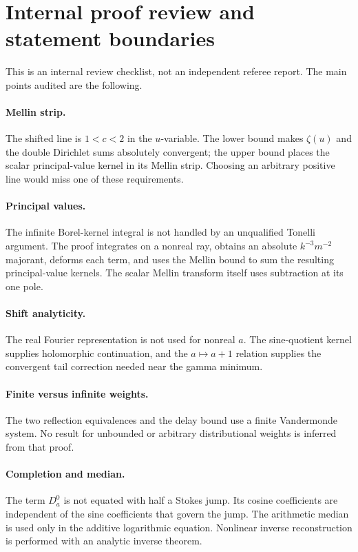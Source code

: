 \documentclass[11pt,a4paper]{article}
\numberwithin{equation}{section}
\theoremstyle{definition}
\theoremstyle{remark}
\begin{document}
\section{Internal proof review and statement boundaries}
\label{app:audit}
This is an internal review checklist, not an independent referee
report. The main points audited are the following.

\paragraph{Mellin strip.}
The shifted line is $1<c<2$ in the $u$-variable. The lower bound makes
$\zeta(u)$ and the double Dirichlet sums absolutely convergent; the
upper bound places the scalar principal-value kernel in its Mellin
strip. Choosing an arbitrary positive line would miss one of these
requirements.

\paragraph{Principal values.}
The infinite Borel-kernel integral is not handled by an unqualified
Tonelli argument. The proof integrates on a nonreal ray, obtains an
absolute $k^{-3}m^{-2}$ majorant, deforms each term, and uses the
Mellin bound to sum the resulting principal-value kernels. The scalar
Mellin transform itself uses subtraction at its one pole.

\paragraph{Shift analyticity.}
The real Fourier representation is not used for nonreal $a$. The
sine-quotient kernel supplies holomorphic continuation, and the
$a\mapsto a+1$ relation supplies the convergent tail correction needed
near the gamma minimum.

\paragraph{Finite versus infinite weights.}
The two reflection equivalences and the delay bound use a finite
Vandermonde system. No result for unbounded or arbitrary distributional
weights is inferred from that proof.

\paragraph{Completion and median.}
The term $D_a^0$ is not equated with half a Stokes jump. Its cosine
coefficients are independent of the sine coefficients that govern
the jump. The arithmetic median is used only in the additive
logarithmic equation. Nonlinear inverse reconstruction is performed
with an analytic inverse theorem.
\end{document}

